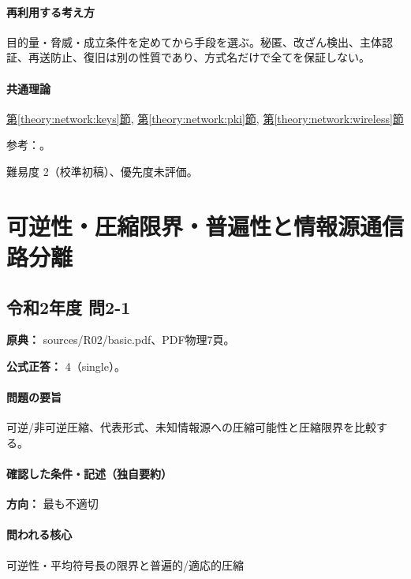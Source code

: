 \paragraph{再利用する考え方} 目的量・脅威・成立条件を定めてから手段を選ぶ。秘匿、改ざん検出、主体認証、再送防止、復旧は別の性質であり、方式名だけで全てを保証しない。

\paragraph{共通理論} \hyperref[theory:network:keys]{第\ref*{theory:network:keys}節}, \hyperref[theory:network:pki]{第\ref*{theory:network:pki}節}, \hyperref[theory:network:wireless]{第\ref*{theory:network:wireless}節}

\par 参考：\cite{net_pki,net_signature,net_wep}。

\par 難易度 2（校準初稿）、優先度未評価。

\section{可逆性・圧縮限界・普遍性と情報源通信路分離}

\subsection{令和2年度 問2-1}
\label{q:r02-reg-basic-2-1}

\noindent\textbf{原典：} sources/R02/basic.pdf、PDF物理7頁。

\textbf{公式正答：} 4（single）。

\paragraph{問題の要旨} 可逆/非可逆圧縮、代表形式、未知情報源への圧縮可能性と圧縮限界を比較する。

\paragraph{確認した条件・記述（独自要約）}\mbox{}\par

\noindent\textbf{方向：} 最も不適切\par

\paragraph{問われる核心} 可逆性・平均符号長の限界と普遍的/適応的圧縮

